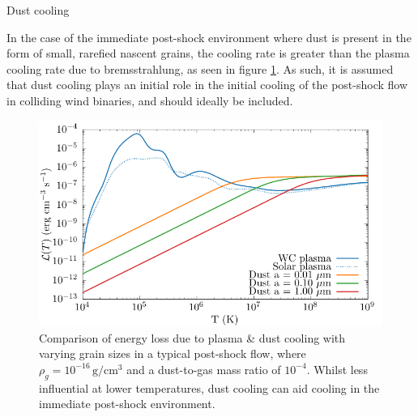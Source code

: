 Dust cooling 


In the case of the immediate post-shock environment where dust is present in the form of small, rarefied nascent grains, the cooling rate is greater than the plasma cooling rate due to bremsstrahlung, as seen in figure \ref{fig:postshockcoolcomparison-chapter3}.
As such, it is assumed that dust cooling plays an initial role in the initial cooling of the post-shock flow in colliding wind binaries, and should ideally be included.

\begin{figure}[h]
  \centering
  \includegraphics{assets/dust-plasma-cooling-comparison/cooling-comparison-forpaper2.pdf}
  \caption[Comparison of dust and plasma cooling rates in post-shock environment]{Comparison of energy loss due to plasma \& dust cooling with varying grain sizes in a typical post-shock flow, where $\rho_g = 10^{-16} \, \si{\gram\per\centi\metre\cubed}$ and a dust-to-gas mass ratio of $10^{-4}$. Whilst less influential at lower temperatures, dust cooling can aid cooling in the immediate post-shock environment.}
  \label{fig:postshockcoolcomparison-chapter3}
\end{figure}


